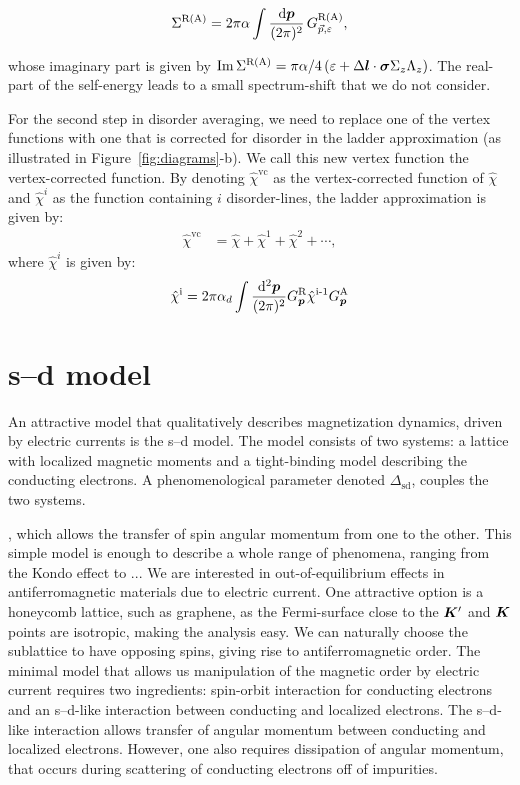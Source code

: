 \begin{equation}
\Sigma^\text{R(A)} = 2\pi\alpha \int \frac{\mathrm{d}\boldsymbol{p}}{(2\pi)^2}\,G^\text{R(A)}_{\vec{p},\varepsilon},
\end{equation}

whose imaginary part is given by $\operatorname{Im} \Sigma^\text{R(A)} = \pi\alpha/4\,(\varepsilon + \Delta \boldsymbol{l}\cdot\boldsymbol{\sigma}\Sigma_z\Lambda_z)$. The real-part of the self-energy leads to a small spectrum-shift that we do not consider. 

For the second step in disorder averaging, we need to replace one of the vertex functions with one that is corrected for disorder in the ladder approximation (as illustrated in Figure~\ref{fig:diagrams}-b). We call this new vertex function the vertex-corrected function. 
By denoting $\hat{\chi}^{\text{vc}}$ as the vertex-corrected function of $\hat{\chi}$ and $\hat{\chi}^i$ as the function containing $i$ disorder-lines, the ladder approximation is given by:
\begin{align}
    \hat{\chi}^\text{vc}
      &=           
        \hat{\chi}+\hat{\chi}^1+\hat{\chi}^2+\cdots,
        \label{intro:eq:ladder}
\end{align}
where $\hat{\chi}^i$ is given by:
\begin{align}
    \hat{\chi}^\text{i} = 2\pi\alpha_d\int\frac{\mathrm{d}^2\boldsymbol{p}}{(2\pi)^2} G_{\boldsymbol{p}}^\text{R}\hat{\chi}^\text{i-1}G_{\boldsymbol{p}}^\text{A}
    \label{intro:eq:onedisorderline}
\end{align}

\section{s--d model}
An attractive model that qualitatively describes magnetization dynamics, driven by electric currents is the s--d model. The model consists of two systems: a lattice with localized magnetic moments and a tight-binding model describing the conducting electrons. A phenomenological parameter denoted $\Delta_\text{sd}$, couples the two systems. 

, which allows the transfer of spin angular momentum from one to the other. This simple model is enough to describe a whole range of phenomena, ranging from the Kondo effect to ... 
We are interested in out-of-equilibrium effects in antiferromagnetic materials due to electric current. One attractive option is a honeycomb lattice, such as graphene, as the Fermi-surface close to the $\boldsymbol{K}'$ and $\boldsymbol{K}$ points are isotropic, making the analysis easy. We can naturally choose the sublattice to have opposing spins, giving rise to antiferromagnetic order. The minimal model that allows us manipulation of the magnetic order by electric current requires two ingredients: spin-orbit interaction for conducting electrons and an s--d-like interaction between conducting and localized electrons. The s--d-like interaction allows transfer of angular momentum between conducting and localized electrons. However, one also requires dissipation of angular momentum, that occurs during scattering of conducting electrons off of impurities. 

